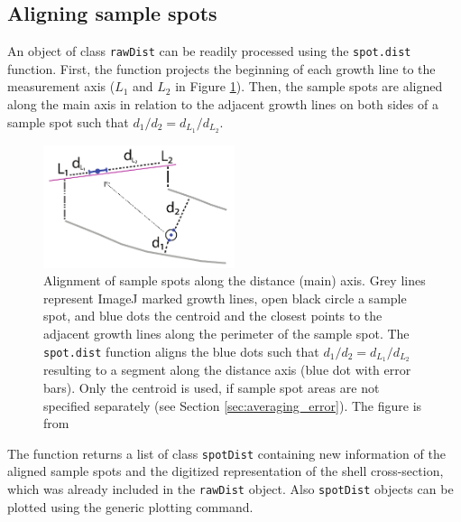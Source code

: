 \documentclass[11pt, a4paper]{article}
\newcommand{\mnote}[1]
{\marginnote{\footnotesize \raggedright \texttt{#1}}}
\begin{document}
\subsection{Aligning sample spots} \label{sec:spot.dist}

\mnote{spot.dist} An object of class \texttt{rawDist} can be readily processed using the \texttt{spot.dist} function. First, the function projects the beginning of each growth line to the measurement axis ($L_1$ and $L_2$ in Figure \ref{Fig:traverse}). Then, the sample spots are aligned along the main axis in relation to the adjacent growth lines on both sides of a sample spot such that $d_1/d_2 = d_{L_1}/d_{L_2}$.

\begin{figure}[ht]
\begin{center}
\includegraphics[width=0.5\textwidth]{spot_alignment.pdf}
\caption{Alignment of sample spots along the distance (main) axis. Grey lines represent ImageJ marked growth lines, open black circle a sample spot, and blue dots the centroid and the closest points to the adjacent growth lines along the perimeter of the sample spot. The \texttt{spot.dist} function aligns the blue dots such that $d_1/d_2 = d_{L_1}/d_{L_2}$ resulting to a segment along the distance axis (blue dot with error bars). Only the centroid is used, if sample spot areas are not specified separately (see Section \ref{sec:averaging_error}). The figure is from \citet{Vihtakari2016}}
\label{Fig:traverse}
\end{center}
\end{figure}

\mnote{plot.
spotDist} The function returns a list of class \texttt{spotDist} containing new information of the aligned sample spots and the digitized representation of the shell cross-section, which was already included in the \texttt{rawDist} object. Also \texttt{spotDist} objects can be plotted using the generic plotting command.
\end{document}
